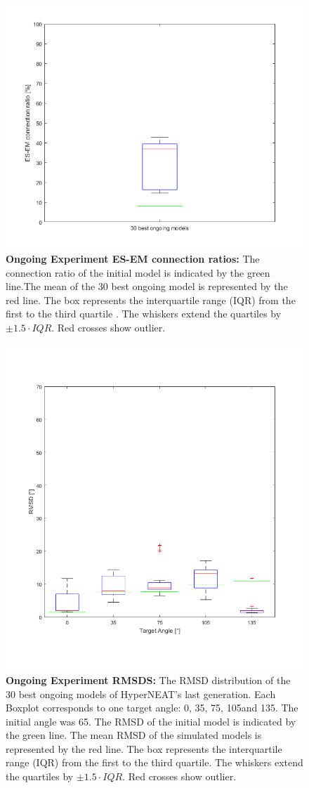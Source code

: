 \begin{figure}[tb]
	\centering
	\includegraphics[width=0.7\linewidth]{figures/OngoingModel/connProbBox}
	\caption[Ongoing Experiment ES-EM connection ratios]{\textbf{Ongoing Experiment ES-EM connection ratios:} The connection ratio of the initial model is indicated by the green line.The mean of the 30 best ongoing model is represented by the red line. The box represents the interquartile range (IQR) from the first to the third quartile . The whiskers extend the quartiles by $\pm1.5\cdot IQR$. Red crosses show outlier.}
	\label{fig:connprobbox}
\end{figure}	

\begin{figure}[tb]
	\centering
	\includegraphics[width=0.7\linewidth]{figures/OngoingModel/ongoingBoxPlot}
	\caption[Ongoing Experiment RMSDS]{\textbf{Ongoing Experiment RMSDS:} The RMSD distribution of the 30 best ongoing models of HyperNEAT's last generation. Each Boxplot corresponds to one target angle: 0\degree, 35\degree, 75\degree, 105\degree and 135\degree. The initial angle was 65\degree. The RMSD of the initial model is indicated by the green line. The mean RMSD of the simulated models is represented by the red line. The box represents the interquartile range (IQR) from the first to the third quartile. The whiskers extend the quartiles by $\pm1.5\cdot IQR$. Red crosses show outlier.}
	\label{fig:ongoingboxplot}
\end{figure}


